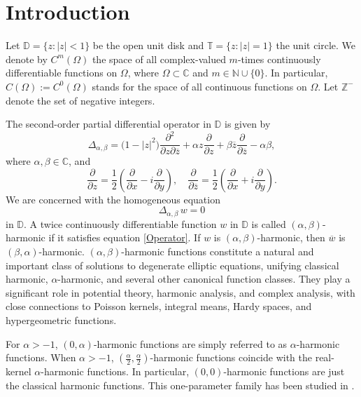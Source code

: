 \documentclass[11pt, reqno]{amsart}
\theoremstyle{definition}
\numberwithin{equation}{section}
\theoremstyle{remark}
\numberwithin{equation}{section}
\begin{document}
	
	\section{Introduction}
	Let $\mathbb{D} = \{z : |z| < 1\}$ be the open unit disk and $\mathbb{T} = \{z : |z| = 1\}$ the unit circle.
We denote by $C^m(\Omega)$ the space of all complex-valued $m$-times continuously differentiable
functions on $\Omega$, where $\Omega \subset \mathbb{C}$ and $m \in \mathbb{N} \cup \{0\}$.
In particular, $C(\Omega) := C^0(\Omega)$ stands for the space of all continuous functions on $\Omega$.
Let $\mathbb{Z}^-$ denote the set of negative integers.

The second-order partial differential operator in $\mathbb{D}$ is given by
\[
\Delta_{\alpha,\beta}
= \bigl(1-|z|^2\bigr)\frac{\partial^2}{\partial z\partial\overline{z}}
+ \alpha z\frac{\partial}{\partial z}
+ \beta \overline{z}\frac{\partial}{\partial\overline{z}}
- \alpha\beta,
\]
where $\alpha, \beta \in \mathbb{C}$, and
\[
\frac{\partial}{\partial z}
= \frac12\left(\frac{\partial}{\partial x} - i\frac{\partial}{\partial y}\right),\quad
\frac{\partial}{\partial\overline{z}}
= \frac12\left(\frac{\partial}{\partial x} + i\frac{\partial}{\partial y}\right).
\]
We are concerned with the homogeneous equation
\begin{equation}\label{Operator}
\Delta_{\alpha,\beta}\, w = 0
\end{equation}
in $\mathbb{D}$.
A twice continuously differentiable function $w$ in $\mathbb{D}$
is called $(\alpha,\beta)$-harmonic if it satisfies equation \eqref{Operator}.
If $w$ is $(\alpha,\beta)$-harmonic, then $\overline{w}$ is $(\beta,\alpha)$-harmonic.
$(\alpha,\beta)$-harmonic functions constitute a natural and important class of solutions to degenerate elliptic equations, unifying classical harmonic, $\alpha$-harmonic, and several other canonical function classes. They play a significant role in potential theory, harmonic analysis, and complex analysis, with close connections to Poisson kernels, integral means, Hardy spaces, and hypergeometric functions.

For $\alpha > -1$, $(0,\alpha)$-harmonic functions are simply referred to as $\alpha$-harmonic functions.
When $\alpha >-1$, $(\frac{\alpha}{2},\frac{\alpha}{2})$-harmonic functions
coincide with the real-kernel $\alpha$-harmonic functions.
In particular, $(0,0)$-harmonic functions are just the classical harmonic functions. %
This one-parameter family has been studied in \cite{cw,lr,Olofsson,OlofssonWittsten}. 
\end{document}
